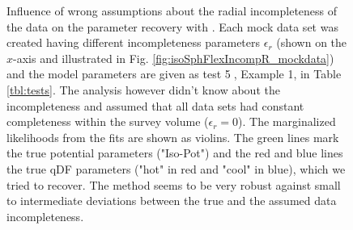 \addtocounter{figure}{-1}
\begin{figure} [t!]
\caption{Influence of wrong assumptions about the radial incompleteness of the data on the parameter recovery with \RM. Each mock data set was created having different incompleteness parameters $\epsilon_r$ (shown on the $x$-axis and illustrated in Fig. \ref{fig:isoSphFlexIncompR_mockdata}) and the model parameters are given as test \textcircled{5}, Example 1, in Table \ref{tbl:tests}. The analysis however didn't know about the incompleteness and assumed that all data sets had constant completeness within the survey volume ($\epsilon_r = 0$). The marginalized likelihoods from the fits are shown as violins. The green lines mark the true potential parameters ("Iso-Pot") and the red and blue lines the true qDF parameters ("hot" \MAP in red and "cool" \MAP in blue), which we tried to recover. The \RM method seems to be very robust against small to intermediate deviations between the true and the assumed data incompleteness.} 
\label{fig:isoSphFlexIncompR_violins}
\end{figure}

